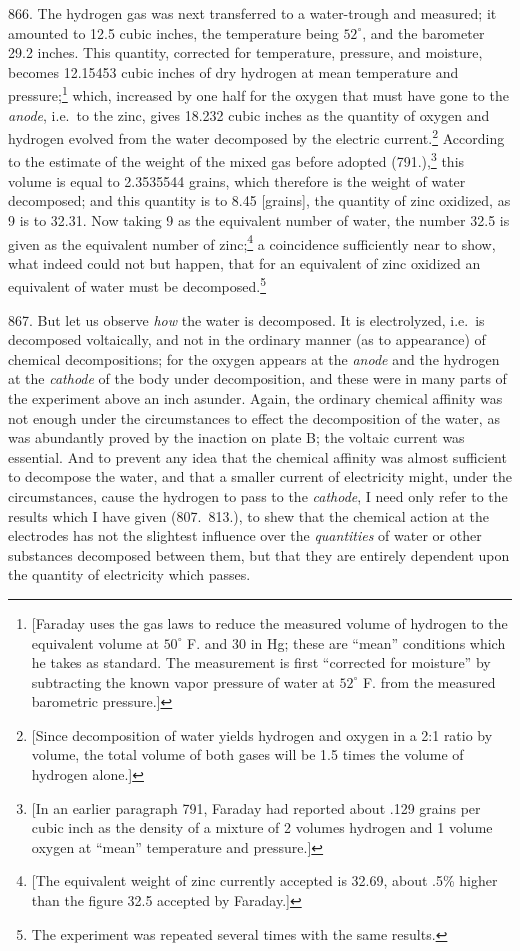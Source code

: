 866. The hydrogen gas was next transferred to a water-trough and
measured; it amounted to 12.5 cubic inches, the temperature being $52^{\circ}$,
and the barometer 29.2 inches. This quantity, corrected for temperature,
pressure, and moisture, becomes 12.15453 cubic inches of dry hydrogen at
mean temperature and pressure;\footnote{{[}Faraday uses the gas laws to
  reduce the measured volume of hydrogen to the equivalent volume at $50^{\circ}$
  F. and 30 in Hg; these are ``mean'' conditions which he takes as
  standard. The measurement is first ``corrected for moisture'' by
  subtracting the known vapor pressure of water at $52^{\circ}$ F. from the
  measured barometric pressure.{]}} which, increased by one half for the
oxygen that must have gone to the \emph{anode}, i.e.\ to the zinc, gives
18.232 cubic inches as the quantity of oxygen and hydrogen evolved from
the water de\-com\-posed by the electric current.\footnote{{[}Since
  de\-com\-po\-si\-tion of water yields hydrogen and oxygen in a 2:1 ratio by
  volume, the total volume of both gases will be 1.5 times the volume of
  hydrogen alone.{]}} According to the estimate of the weight of the
mixed gas before adopted (791.),\footnote{{[}In an earlier paragraph
  791, Faraday had reported about .129 grains per cubic inch as the
  density of a mixture of 2 volumes hydrogen and 1 volume oxygen at
  ``mean'' temperature and pressure.{]}} this volume is equal to
2.3535544 grains, which therefore is the weight of water de\-com\-posed; and
this quantity is to 8.45 {[}grains{]}, the quantity of zinc oxidized, as
9 is to 32.31. Now taking 9 as the equivalent number of water, the
number 32.5 is given as the equivalent number of zinc;\footnote{{[}The
  equivalent weight of zinc currently accepted is 32.69, about .5\%
  higher than the figure 32.5 accepted by Faraday.{]}} a coincidence
sufficiently near to show, what indeed could not but happen, that for an
equivalent of zinc oxidized an equivalent of water must be
de\-com\-posed.\footnote{The experiment was repeated several times with the
  same results.}

867. But let us observe \emph{how} the water is de\-com\-posed. It is
electrolyzed, i.e.\ is de\-com\-posed voltaically, and not in the ordinary
manner (as to appearance) of chemical de\-com\-po\-si\-tions; for the oxygen
appears at the \emph{anode} and the hydrogen at the \emph{cathode} of
the body under de\-com\-po\-si\-tion, and these were in many parts of the
experiment above an inch asunder. Again, the ordinary chemical affinity
was not enough under the circumstances to effect the de\-com\-po\-si\-tion of
the water, as was abundantly proved by the inaction on plate B; the
voltaic current was essential. And to prevent any idea that the chemical
affinity was almost sufficient to decompose the water, and that a
smaller current of electricity might, under the circumstances, cause the
hydrogen to pass to the \emph{cathode}, I need only refer to the results
which I have given (807.\ 813.), to shew that the chemical action at the
electrodes has not the slightest influence over the \emph{quantities} of
water or other substances de\-com\-posed between them, but that they are
entirely dependent upon the quantity of electricity which passes.

